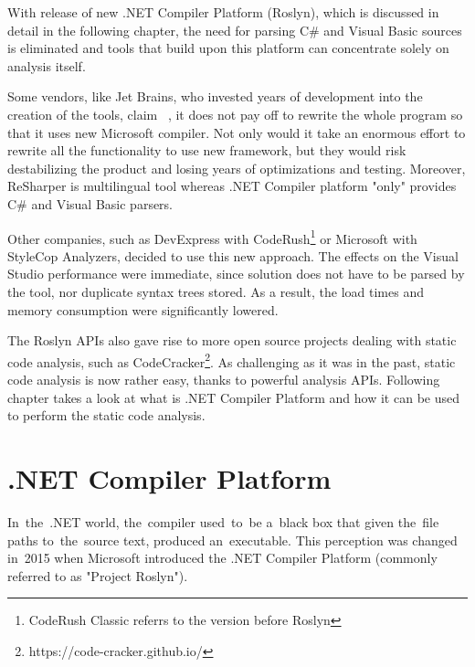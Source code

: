 \documentclass[
  digital, %
  table,   %
  lof,     %
  lot,     %
  oneside,
]{fithesis3}
\begin{document}
With release of new .NET Compiler Platform (Roslyn), which is discussed in detail in the following chapter, the need for parsing C\# and Visual Basic sources is eliminated and tools that build upon this platform can concentrate solely on analysis itself.

Some vendors, like Jet Brains, who invested years of development into the creation of the tools, claim ~\cite{resharper-and-roslyn-qa}, it does not pay off to rewrite the whole program so that it uses new Microsoft compiler. Not only would it take an enormous effort to rewrite all the functionality to use new framework, but they would risk destabilizing the product and losing years of optimizations and testing. Moreover, ReSharper is multilingual tool whereas .NET Compiler platform "only" provides C\# and Visual Basic parsers.

Other companies, such as DevExpress with CodeRush\footnote{CodeRush Classic referrs to the version before Roslyn} or Microsoft with StyleCop Analyzers, decided to use this new approach. The effects on the Visual Studio performance were immediate, since solution does not have to be parsed by the tool, nor duplicate syntax trees stored. As a result, the load times and memory consumption were significantly lowered.

The Roslyn APIs also gave rise to more open source projects dealing with static code analysis, such as CodeCracker\footnote{https://code-cracker.github.io/}. As challenging as it was in the past, static code analysis is now rather easy, thanks to powerful analysis APIs. Following chapter takes a look at what is .NET Compiler Platform and how it can be used to perform the static code analysis.

\chapter{.NET Compiler Platform}
In~the~.NET world, the~compiler used~to~be a~black box that given the~file paths to~the~source text, produced an~executable. This perception was changed in~2015 when Microsoft introduced the .NET Compiler Platform (commonly referred to as "Project Roslyn").  

\end{document}
